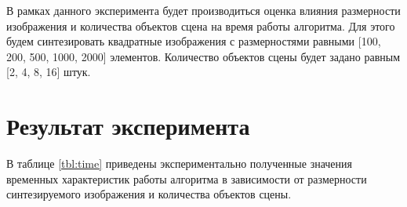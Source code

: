         В рамках данного эксперимента будет производиться оценка влияния размерности изображения и количества объектов сцена на время работы алгоритма. Для этого будем синтезировать квадратные изображения с размерностями равными [100, 200, 500, 1000, 2000] элементов. Количество объектов сцены будет задано равным [2, 4, 8, 16] штук.
 
    \section{Результат эксперимента}

        В таблице \ref{tbl:time} приведены экспериментально полученные значения временных характеристик работы алгоритма в зависимости от размерности синтезируемого изображения и количества объектов сцены.
        
